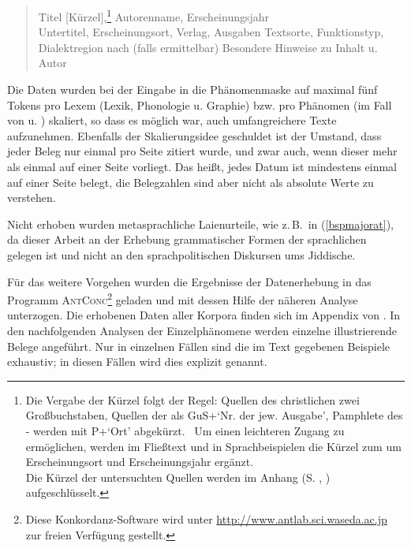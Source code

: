  
 \begin{quote}
	 Titel [Kürzel],\footnote{Die Vergabe der Kürzel folgt der Regel: Quellen des christlichen \hai{{\LiJieins}} zwei Großbuchstaben,  Quellen der  als GuS+‘Nr. der jew. Ausgabe', Pamphlete des - werden mit P+‘Ort' abgekürzt. \,%
	Um einen leichteren Zugang zu ermöglichen, werden im Fließtext und in Sprachbeispielen die Kürzel zum  um Erscheinungsort und Erscheinungsjahr ergänzt.\\
    Die Kürzel der untersuchten Quellen werden im Anhang (S. \pageref{appendixchrliji1}, \pageref{appendixjuedliji1}) %
 aufgeschlüsselt.} Autorenname, Erscheinungsjahr \\  Untertitel, Erscheinungsort, Verlag, Ausgaben 
Textsorte, Funktionstyp, Dia\-lektregion nach \cite{Katz1983} (falls ermittelbar)
Besondere Hinweise zu Inhalt u. Autor
 \end{quote}
		 
 Die Daten wurden bei der Eingabe in die Phänomenmaske auf maximal fünf Tokens pro Lexem (Lexik, Phonologie u. Graphie) bzw. pro Phänomen (im Fall von  u. ) skaliert, so dass es möglich war, auch umfangreichere Texte aufzunehmen.  Ebenfalls der Skalierungsidee geschuldet ist der Umstand, dass jeder Beleg nur einmal pro Seite zitiert wurde, und zwar auch, wenn dieser mehr als einmal auf einer Seite vorliegt. Das heißt, jedes Datum ist mindestens einmal auf einer Seite belegt, die Belegzahlen sind aber nicht als absolute Werte zu verstehen. 
 
 Nicht erhoben wurden metasprachliche Laienurteile, wie z.\,B.\, in (\ref{bspmajorat}), da dieser Arbeit an der Erhebung grammatischer Formen der sprachlichen  gelegen ist und nicht an den sprachpolitischen Diskursen ums Jiddische.

 


Für das weitere Vorgehen wurden die Ergebnisse der Datenerhebung in das Programm \textsc{AntConc}\footnote{Diese Kon­kor­danz-Software wird unter \url{http://www.antlab.sci.waseda.ac.jp} zur freien Verfügung gestellt.} geladen und mit dessen Hilfe der näheren Analyse unterzogen. %
Die erhobenen Daten aller Korpora finden sich im Appendix von \citet{SchaeferDiss}. %
In den nachfolgenden Analysen der Einzelphänomene werden einzelne illustrierende Belege angeführt. Nur in einzelnen Fällen sind die im Text gegebenen Beispiele exhaustiv; in diesen Fällen wird dies explizit genannt. 

